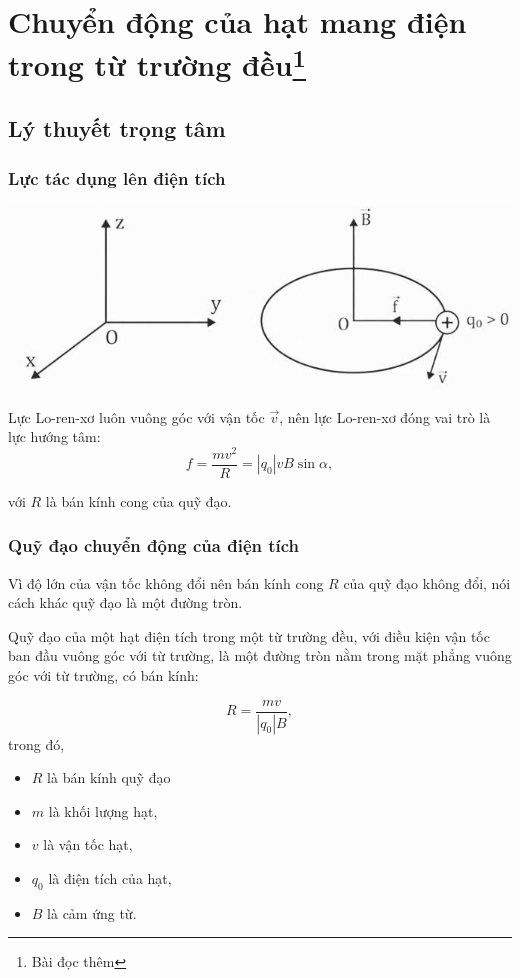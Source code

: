 \chapter[Chuyển động của hạt mang điện trong từ trường đều ]{Chuyển động của hạt mang điện trong từ trường đều\footnote{Bài đọc thêm} }
\section{Lý thuyết trọng tâm}
\subsection{Lực tác dụng lên điện tích}
\begin{center}
	\includegraphics[scale=0.8]{../figs/VN11-PH-27-L-019-2-h82.jpg}
\end{center}

Lực Lo-ren-xơ luôn vuông góc với vận tốc $\vec{v}$, nên lực Lo-ren-xơ đóng vai trò là lực hướng tâm:
\begin{equation}
f=\dfrac{mv^2}{R}=\left|q_0 \right|vB\sin \alpha,
\end{equation}

với $R$ là bán kính cong của quỹ đạo.

\subsection{Quỹ đạo chuyển động của điện tích}

Vì độ lớn của vận tốc không đổi nên bán kính cong $R$ của quỹ đạo không đổi, nói cách khác quỹ đạo là một đường tròn. 


Quỹ đạo của một hạt điện tích trong một từ trường đều, với điều kiện vận tốc ban đầu vuông góc với từ trường, là một đường tròn nằm trong mặt phẳng vuông góc với từ trường, có bán kính:

\begin{equation}
R=\dfrac{mv}{\left| q_0 \right|B},
\end{equation}
trong đó,
\begin{itemize}
	\item $R$ là bán kính quỹ đạo
	\item $m$ là khối lượng hạt,
	\item $v$ là vận tốc hạt,
	\item $q_0$ là điện tích của hạt,
	\item $B$ là cảm ứng từ.
\end{itemize}

